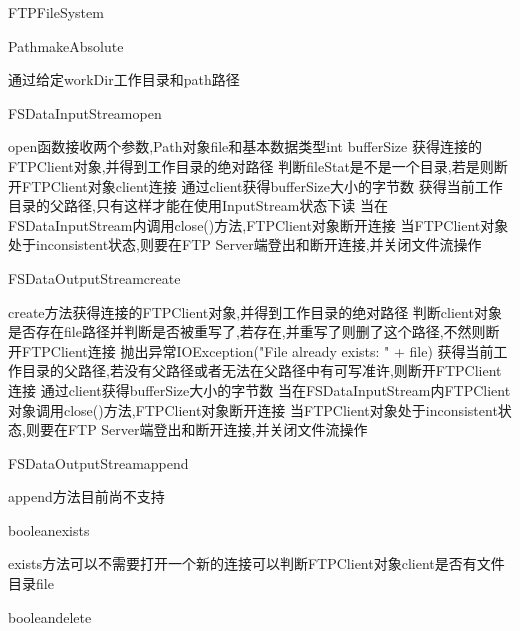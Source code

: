 \begin{XeClass}{FTPFileSystem}
    \begin{XeMethod}{\XePrivate}{Path}{makeAbsolute}
         
 通过给定workDir工作目录和path路径

    \end{XeMethod}

    \begin{XeMethod}{\XePublic}{FSDataInputStream}{open}
         
 open函数接收两个参数,Path对象file和基本数据类型int bufferSize
 获得连接的FTPClient对象,并得到工作目录的绝对路径
 判断fileStat是不是一个目录,若是则断开FTPClient对象client连接
 通过client获得bufferSize大小的字节数
 获得当前工作目录的父路径,只有这样才能在使用InputStream状态下读
 当在FSDataInputStream内调用close()方法,FTPClient对象断开连接
 当FTPClient对象处于inconsistent状态,则要在FTP Server端登出和断开连接,并关闭文件流操作

    \end{XeMethod}

    \begin{XeMethod}{\XePublic}{FSDataOutputStream}{create}
         
 create方法获得连接的FTPClient对象,并得到工作目录的绝对路径
 判断client对象是否存在file路径并判断是否被重写了,若存在,并重写了则删了这个路径,不然则断开FTPClient连接
 抛出异常IOException("File already exists: " + file)
 获得当前工作目录的父路径,若没有父路径或者无法在父路径中有可写准许,则断开FTPClient连接
 通过client获得bufferSize大小的字节数
 当在FSDataInputStream内FTPClient对象调用close()方法,FTPClient对象断开连接
 当FTPClient对象处于inconsistent状态,则要在FTP Server端登出和断开连接,并关闭文件流操作

    \end{XeMethod}

    \begin{XeMethod}{\XePublic}{FSDataOutputStream}{append}
         
 append方法目前尚不支持 

    \end{XeMethod}

    \begin{XeMethod}{\XePrivate}{boolean}{exists}
         
 exists方法可以不需要打开一个新的连接可以判断FTPClient对象client是否有文件目录file

    \end{XeMethod}

    \begin{XeMethod}{\XePublic}{boolean}{delete}
         

\end{XeMethod}
\end{XeClass}
